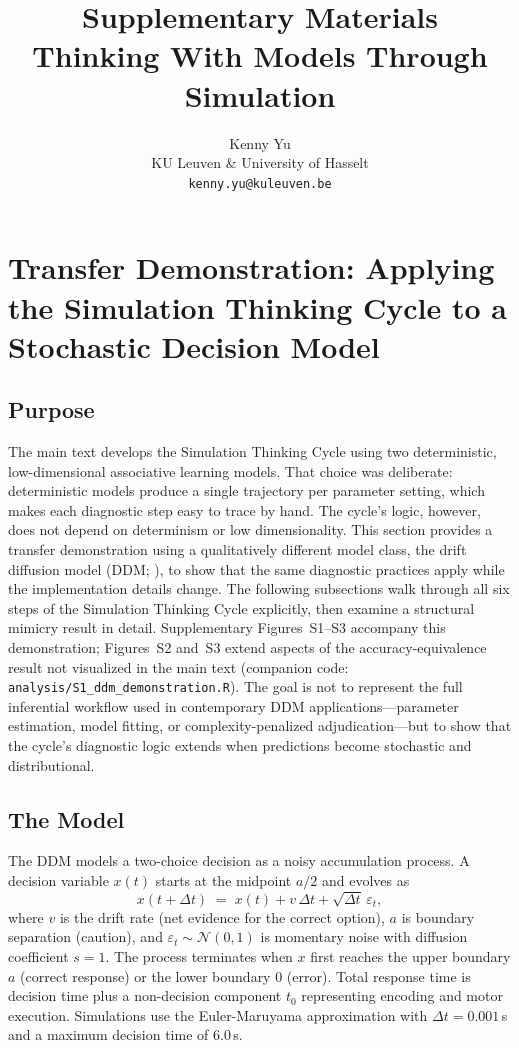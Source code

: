 \documentclass[11pt,a4paper]{article}
\title{\textbf{Supplementary Materials}\\[6pt]
\large Thinking With Models Through Simulation}
\author{Kenny Yu\\KU Leuven \& University of Hasselt\\\texttt{kenny.yu@kuleuven.be}}
\date{}
\begin{document}
\maketitle



\section{Transfer Demonstration: Applying the Simulation Thinking Cycle to a Stochastic Decision Model}
\label{sec:s1}

\subsection*{Purpose}

The main text develops the Simulation Thinking Cycle using two deterministic, low-dimensional associative learning models. That choice was deliberate: deterministic models produce a single trajectory per parameter setting, which makes each diagnostic step easy to trace by hand. The cycle's logic, however, does not depend on determinism or low dimensionality. This section provides a transfer demonstration using a qualitatively different model class, the drift diffusion model (DDM; \citealt{ratcliff1978theory, ratcliff2008diffusion}), to show that the same diagnostic practices apply while the implementation details change. The following subsections walk through all six steps of the Simulation Thinking Cycle explicitly, then examine a structural mimicry result in detail. Supplementary Figures~S1--S3 accompany this demonstration; Figures~S2 and~S3 extend aspects of the accuracy-equivalence result not visualized in the main text (companion code: \texttt{analysis/S1\_ddm\_demonstration.R}). The goal is not to represent the full inferential workflow used in contemporary DDM applications---parameter estimation, model fitting, or complexity-penalized adjudication---but to show that the cycle's diagnostic logic extends when predictions become stochastic and distributional.

\subsection*{The Model}

The DDM models a two-choice decision as a noisy accumulation process. A decision variable $x(t)$ starts at the midpoint $a/2$ and evolves as
\[
  x(t + \Delta t) \;=\; x(t) + v\,\Delta t + \sqrt{\Delta t}\,\varepsilon_t,
\]
where $v$ is the drift rate (net evidence for the correct option), $a$ is boundary separation (caution), and $\varepsilon_t \sim \mathcal{N}(0, 1)$ is momentary noise with diffusion coefficient $s = 1$. The process terminates when $x$ first reaches the upper boundary $a$ (correct response) or the lower boundary $0$ (error). Total response time is decision time plus a non-decision component $t_0$ representing encoding and motor execution. Simulations use the Euler-Maruyama approximation with $\Delta t = 0.001$\,s and a maximum decision time of $6.0$\,s.
\end{document}
